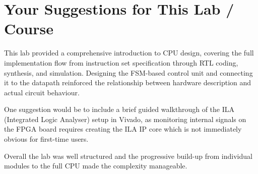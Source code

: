 \documentclass{article}
\begin{document}

\section{Your Suggestions for This Lab / Course}

This lab provided a comprehensive introduction to CPU design, covering the full implementation flow from instruction set specification through RTL coding, synthesis, and simulation. Designing the FSM-based control unit and connecting it to the datapath reinforced the relationship between hardware description and actual circuit behaviour.

One suggestion would be to include a brief guided walkthrough of the ILA (Integrated Logic Analyser) setup in Vivado, as monitoring internal signals on the FPGA board requires creating the ILA IP core which is not immediately obvious for first-time users.

Overall the lab was well structured and the progressive build-up from individual modules to the full CPU made the complexity manageable.
\end{document}
